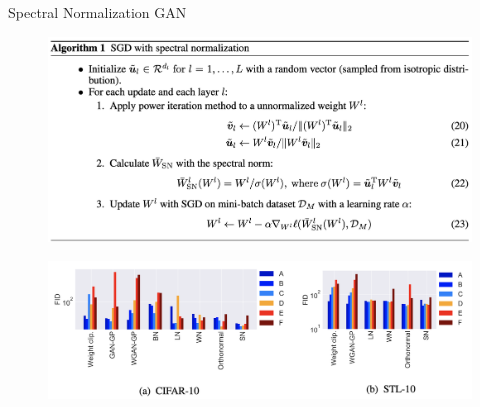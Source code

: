 \documentclass{beamer}
\begin{document}
\begin{frame}{Spectral Normalization GAN}
	\begin{figure}
		\centering
		\includegraphics[width=0.85\linewidth]{figs/sngan_pseudocode}
	\end{figure}
	\begin{figure}
		\centering
		\includegraphics[width=0.85\linewidth]{figs/sngan_fids}
	\end{figure}
	
\end{frame}
\end{document}
